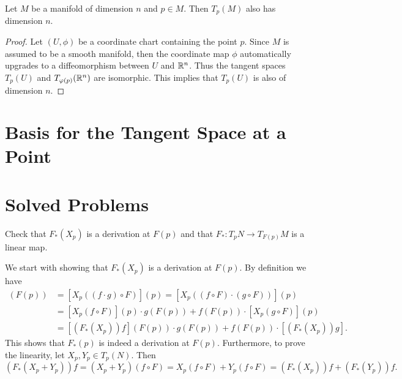 \begin{corollary}
	Let $ M $ be a manifold of dimension $ n $ and $ p \in M $. Then $ T_p(M) $ also has dimension $ n $.
\end{corollary}
\begin{proof}
	Let $ (U,\phi) $ be a coordinate chart containing the point $ p $. Since $ M $ is assumed to be a smooth manifold, then the coordinate map $ \phi $ automatically upgrades to a diffeomorphism between $ U $ and $ \mathbb{R}^n $. Thus the tangent spaces $ T_p(U) $ and $ T_{\varphi(p)}(\mathbb{R}^n) $ are isomorphic. This implies that $ T_p(U) $ is also of dimension $ n $.
\end{proof}

\section{Basis for the Tangent Space at a Point}


\section{Solved Problems}
\begin{problem}
	\label{prob:DifferentialOfAMapIsADerivation}
	Check that $ F_*(X_p) $ is a derivation at $ F(p) $ and that $ F_*: T_p N \to T_{F(p)}M  $ is a linear map.
\end{problem}
\begin{solution}
	We start with showing that $ F_*(X_p) $ is a derivation at $ F(p) $. By definition we have
	\begin{align*}
		[(F_*(X_p))(f\cdot g)](F(p)) &=  [ X_p((f\cdot g)\circ F) ](p) = [ X_p((f\circ F) \cdot (g\circ F)) ](p)\\
		&= [X_p(f\circ F)](p) \cdot g(F(p)) + f(F(p))\cdot [X_p(g\circ F)](p)\\
		&= [(F_*(X_p))f](F(p)) \cdot g(F(p)) + f(F(p))\cdot [(F_*(X_p))g].
 	\end{align*}
 	This shows that $ F_*(p) $ is indeed a derivation at $ F(p) $. Furthermore, to prove the linearity, let $ X_p, Y_p \in T_p(N) $. Then
 	\[ (F_*(X_p + Y_p))f = (X_p + Y_p)(f\circ F) = X_p(f\circ F) + Y_p(f\circ F) = (F_*(X_p)) f + (F_*(Y_p)) f. \]
\end{solution}